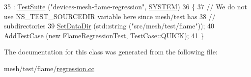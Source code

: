 \begin{DoxyCode}
35                           : \hyperlink{classns3_1_1TestSuite_a904b0c40583b744d30908aeb94636d1a}{TestSuite} (\textcolor{stringliteral}{"devices-mesh-flame-regression"}, 
      \hyperlink{classns3_1_1TestSuite_a1ebfcab34ec8161e085e8e3a1855eae0a90c5529a26ab3a5ffcc6e57040dbd82e}{SYSTEM}) 
36   \{
37     \textcolor{comment}{// We do not use NS\_TEST\_SOURCEDIR variable here since mesh/test has }
38     \textcolor{comment}{// subdirectories}
39     \hyperlink{classns3_1_1TestCase_ab002fb0e5071fcde71a92ca9e8224b23}{SetDataDir} (std::string (\textcolor{stringliteral}{"src/mesh/test/flame"}));
40     \hyperlink{classns3_1_1TestCase_a3718088e3eefd5d6454569d2e0ddd835}{AddTestCase} (\textcolor{keyword}{new} \hyperlink{classFlameRegressionTest}{FlameRegressionTest}, TestCase::QUICK);
41   \}
\end{DoxyCode}


The documentation for this class was generated from the following file\+:\begin{DoxyCompactItemize}
\item 
mesh/test/flame/\hyperlink{flame_2regression_8cc}{regression.\+cc}\end{DoxyCompactItemize}

